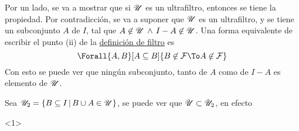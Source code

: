 \begin{demo}[i] Por un lado, se va a mostrar que si $\mathscr{U}$ es un ultrafiltro,
  entonces se tiene la propiedad. Por contradicción, se va a suponer
  que $\mathscr{U}$ es un ultrafiltro, y se tiene un subconjunto $A$ de $I$, tal
  que $A \not\in \mathscr{U} \,\land\, I-A\not\in\mathscr{U}$. Una forma equivalente de escribir
  el punto (ii) de la \hyperref[def:filtro]{definición de filtro} es
  \[\Forall{A,B}[A\subseteq B]{B\not\in\F \To A\not\in\F}\]
  Con esto se puede ver que ningún subconjunto, tanto de $A$ como de $I-A$
  es elemento de $\mathscr{U}$.

  Sea $\mathscr{U}_2 = \{B \subseteq I \,|\, B \cup A \in \mathscr{U}\}$, se puede ver que
  $\mathscr{U} \subset \mathscr{U}_2$, en efecto
  \begin{longderivation}<1>
      \\
    \To\\
      \\
    \equiv\\
  \end{longderivation}


\end{demo}
